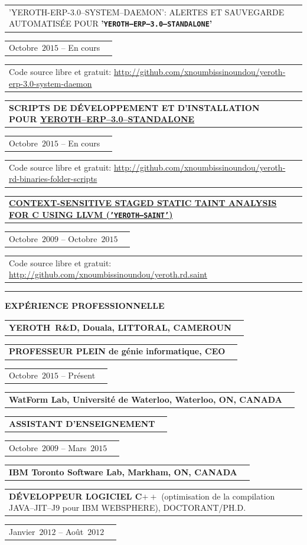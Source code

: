 \documentclass[9pt,a4paper]{article} %
\makeatletter
\newcommand{\yerothrd}{YEROTH~R\&D\xspace}
\newcommand{\headerrow}[2]
{\begin{tabular*}{\linewidth}{l@{\extracolsep{\fill}}r}
	#1 &
	#2 \\
\end{tabular*}}
\newcommand{\headerrowONE}[1]{\headerrow{#1}{}}
\newcommand{\cplusplus}{C$++$\xspace}
\newcommand{\cvitemdate}[2]{#1~$#2$\xspace}
\newcommand{\cvitempositionheld}[1]{\textbf{#1}\xspace}
\makeatother
\begin{document}
\vspace{0.3em}

\headerrowONE{'YEROTH-ERP-3.0--SYSTEM--DAEMON': ALERTES ET SAUVEGARDE AUTOMATISÉE
  POUR \textbf{'\texttt{YEROTH--ERP--3.0--STANDALONE}'}}
  \headerrowONE{\cvitemdate{Octobre}{2015} -- En cours}
\headerrowONE{Code source libre et gratuit: \url{http://github.com/xnoumbissinoundou/yeroth-erp-3.0-system-daemon}}

\vspace{0.3em}

\headerrowONE{\textbf{SCRIPTS DE DÉVELOPPEMENT ET D'INSTALLATION
  POUR 
  \href{http://github.com/xnoumbissinoundou/yeroth-erp-3.0}{\textbf{YEROTH--ERP--3.0--STANDALONE}}}}
  \headerrowONE{\cvitemdate{Octobre}{2015} -- En cours}
\headerrowONE{Code source libre et gratuit: \url{http://github.com/xnoumbissinoundou/yeroth-rd-binaries-folder-scripts}}

\vspace{0.3em}

\headerrowONE{\href{http://archive.org/details/saint_201507}{\textbf{CONTEXT-SENSITIVE STAGED STATIC TAINT ANALYSIS FOR C USING LLVM (\texttt{'YEROTH--SAINT'})}}}
\headerrowONE{\cvitemdate{Octobre}{2009} -- \cvitemdate{Octobre}{2015}}
\headerrowONE{Code source libre et gratuit: \url{http://github.com/xnoumbissinoundou/yeroth.rd.saint}}
	
	
\vspace{1em}


\hrule
\begin{center}
{\large \textbf{EXPÉRIENCE PROFESSIONNELLE}}
\end{center}

\vspace{0.5em}

\headerrowONE{\textbf{\yerothrd, Douala, LITTORAL, CAMEROUN}}
\headerrowONE{\cvitempositionheld{PROFESSEUR PLEIN de génie informatique, CEO}}
\headerrowONE{\cvitemdate{Octobre}{2015} -- Présent}	

\vspace{0.3em}

\headerrowONE{\textbf{WatForm Lab, Université de Waterloo, Waterloo, ON, CANADA}}	
\headerrowONE{\cvitempositionheld{ASSISTANT D'ENSEIGNEMENT}}
\headerrowONE{\cvitemdate{Octobre}{2009} -- \cvitemdate{Mars}{2015}}
	
\vspace{0.3em}

\headerrowONE{\textbf{IBM Toronto Software Lab, Markham, ON, CANADA}}	
\headerrowONE{\cvitempositionheld{DÉVELOPPEUR LOGICIEL \cplusplus} (optimisation de la compilation JAVA--JIT--J$9$
	pour IBM WEBSPHERE), DOCTORANT/PH.D.}
\headerrowONE{\cvitemdate{Janvier}{2012} -- \cvitemdate{Août}{2012}}	
\end{document}
